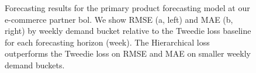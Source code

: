 \documentclass[preprint, 3p, times, twocolumn]{elsarticle}
\begin{document}
  \begin{figure}[t] 
     \quad
    \caption{Forecasting results for the primary product forecasting model at our e-commerce partner bol. We show RMSE (a, left) and MAE (b, right) by weekly demand bucket relative to the Tweedie loss baseline for each forecasting horizon (week). The Hierarchical loss outperforms the Tweedie loss on RMSE and MAE on smaller weekly demand buckets.}
    \label{fig:bol_results}
  \end{figure}
\end{document}
